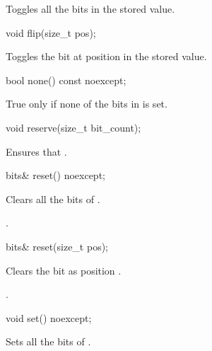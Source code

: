 \begin{addedblock}
\begin{itemdescr}
\effects Toggles all the bits in the stored value.
\end{itemdescr}

\begin{itemdecl}
void flip(size_t pos);
\end{itemdecl}

\begin{itemdescr}
\effects Toggles the bit at position  in the stored value.
\end{itemdescr}

\begin{itemdecl}
bool none() const noexcept;
\end{itemdecl}

\begin{itemdescr}
\returns True only if none of the bits in  is set.
\end{itemdescr}

\begin{itemdecl}
void reserve(size_t bit_count);
\end{itemdecl}

\begin{itemdescr}
\effects Ensures that .
\end{itemdescr}

\begin{itemdecl}
bits& reset() noexcept;
\end{itemdecl}

\begin{itemdescr}
\effects Clears all the bits of .

\returns {}.
\end{itemdescr}

\begin{itemdecl}
bits& reset(size_t pos);
\end{itemdecl}

\begin{itemdescr}
\effects Clears the bit as position .

\returns {}.
\end{itemdescr}

\begin{itemdecl}
void set() noexcept;
\end{itemdecl}

\begin{itemdescr}
\effects Sets all the bits of .


\end{itemdescr}
\end{addedblock}
